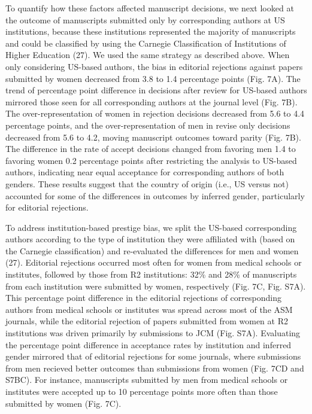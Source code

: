 \documentclass[11pt,]{article}
\begin{document}
To quantify how these factors affected manuscript decisions, we next
looked at the outcome of manuscripts submitted only by corresponding
authors at US institutions, because these institutions represented the
majority of manuscripts and could be classified by using the Carnegie
Classification of Institutions of Higher Education (27). We used the
same strategy as described above. When only considering US-based
authors, the bias in editorial rejections against papers submitted by
women decreased from 3.8 to 1.4 percentage points (Fig. 7A). The trend
of percentage point difference in decisions after review for US-based
authors mirrored those seen for all corresponding authors at the journal
level (Fig. 7B). The over-representation of women in rejection decisions
decreased from 5.6 to 4.4 percentage points, and the over-representation
of men in revise only decisions decreased from 5.6 to 4.2, moving
manuscript outcomes toward parity (Fig. 7B). The difference in the rate
of accept decisions changed from favoring men 1.4 to favoring women 0.2
percentage points after restricting the analysis to US-based authors,
indicating near equal acceptance for corresponding authors of both
genders. These results suggest that the country of origin (i.e., US
versus not) accounted for some of the differences in outcomes by
inferred gender, particularly for editorial rejections.

To address institution-based prestige bias, we split the US-based
corresponding authors according to the type of institution they were
affiliated with (based on the Carnegie classification) and re-evaluated
the differences for men and women (27). Editorial rejections occurred
most often for women from medical schools or institutes, followed by
those from R2 institutions: 32\% and 28\% of manuscripts from each
institution were submitted by women, respectively (Fig. 7C, Fig. S7A).
This percentage point difference in the editorial rejections of
corresponding authors from medical schools or institutes was spread
across most of the ASM journals, while the editorial rejection of papers
submitted from women at R2 institutions was driven primarily by
submissions to JCM (Fig. S7A). Evaluating the percentage point
difference in acceptance rates by institution and inferred gender
mirrored that of editorial rejections for some journals, where
submissions from men recieved better outcomes than submissions from
women (Fig. 7CD and S7BC). For instance, manuscripts submitted by men
from medical schools or institutes were accepted up to 10 percentage
points more often than those submitted by women (Fig. 7C).
\end{document}
